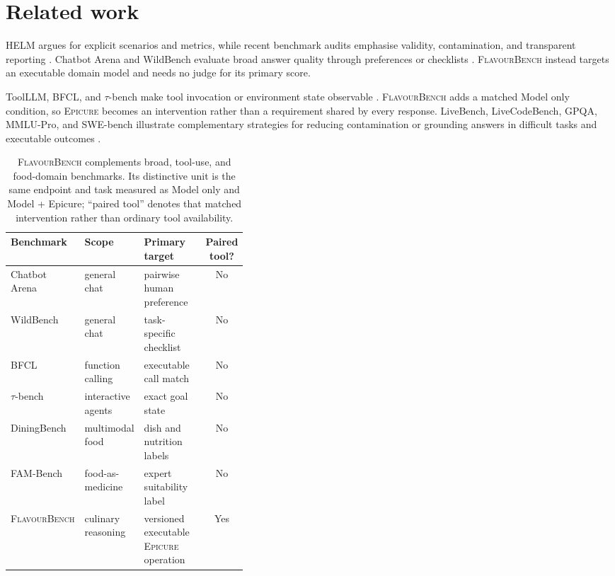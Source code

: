 \documentclass[10pt,twocolumn]{article}
\newcommand{\system}{\textsc{FlavourBench}}
\newcommand{\epicure}{\textsc{Epicure}}
\begin{document}
\section{Related work}

HELM argues for explicit scenarios and metrics, while recent benchmark audits emphasise validity,
contamination, and transparent reporting \cite{liang2022helm,reuel2024betterbench}. Chatbot Arena
and WildBench evaluate broad answer quality through preferences or checklists
\cite{chiang2024chatbotarena,lin2024wildbench}. \system{} instead targets an executable domain model
and needs no judge for its primary score.

ToolLLM, BFCL, and $\tau$-bench make tool invocation or environment state observable
\cite{qin2023toolllm,patil2025bfcl,yao2024taubench}. \system{} adds a matched Model only condition,
so \epicure{} becomes an intervention rather than a requirement shared by every response. LiveBench,
LiveCodeBench, GPQA, MMLU-Pro, and SWE-bench illustrate complementary strategies for reducing
contamination or grounding answers in difficult tasks and executable outcomes
\cite{white2024livebench,jain2024livecodebench,rein2023gpqa,wang2024mmlupro,jimenez2023swebench}.

\begin{table}[t]
  \centering
  \small
  \begin{tabularx}{\linewidth}{@{}>{\raggedright\arraybackslash}p{0.19\linewidth}
      >{\raggedright\arraybackslash}p{0.20\linewidth} X c@{}}
    \toprule
    Benchmark & Scope & Primary target & \shortstack{Paired\\tool?} \\
    \midrule
    Chatbot Arena & general chat & pairwise human preference & No \\
    WildBench & general chat & task-specific checklist & No \\
    BFCL & function calling & executable call match & No \\
    $\tau$-bench & interactive agents & exact goal state & No \\
    DiningBench & multimodal food & dish and nutrition labels & No \\
    FAM-Bench & food-as-medicine & expert suitability label & No \\
    \system{} & culinary reasoning & versioned executable \epicure{} operation & Yes \\
    \bottomrule
  \end{tabularx}
  \caption{\system{} complements broad, tool-use, and food-domain benchmarks. Its distinctive unit
  is the same endpoint and task measured as Model only and Model + Epicure; ``paired tool'' denotes
  that matched intervention rather than ordinary tool availability.}
  \label{tab:benchmark-comparison}
\end{table}
\end{document}
